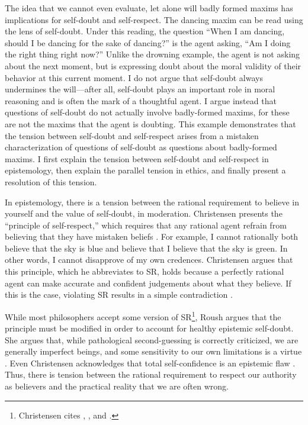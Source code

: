 \begin{isabellebody}
\begin{isamarkuptext}
The idea that we cannot even evaluate, let alone will badly formed maxims has implications for 
self-doubt and self-respect. The dancing maxim can be read using the lens of self-doubt. Under this 
reading, the question ``When I am dancing, should I be dancing for the sake of dancing?'' is the agent asking, 
``Am I doing the right thing right now?'' Unlike the drowning example, the agent is not asking about the 
next moment, but is expressing doubt about the moral validity of their behavior at this current moment. 
I do not argue that self-doubt always undermines the will—after all, self-doubt plays an 
important role in moral reasoning and is often the mark of a thoughtful agent. I argue instead 
that questions of self-doubt do not actually involve badly-formed maxims, for these are not the maxims 
that the agent is doubting. This example demonstrates that the tension between self-doubt and self-respect 
arises from a mistaken characterization of questions of self-doubt as questions about badly-formed maxims.
I first explain the tension between self-doubt and self-respect in epistemology, then 
explain the parallel tension in ethics, and finally present a resolution of this tension.

In epistemology, there is a tension between the rational requirement to believe in yourself and the 
value of self-doubt, in moderation. Christensen presents the ``principle of self-respect,'' which requires 
that any rational agent refrain from believing that they have mistaken beliefs \cite[4]{christensen}. For example, I cannot 
rationally both believe that the sky is blue and believe that I believe that the sky is green. In other words, I cannot 
disapprove of my own credences. Christensen argues that this principle, which he abbreviates to SR, holds because 
a perfectly rational agent can make accurate and confident judgements about what they believe. If this 
is the case, violating SR results in a simple contradiction \cite[8-9]{christensen}. 

While most philosophers accept some version of SR\footnote{Christensen cites \citet{vanfraaseen}, 
\citet{vickers}, and \citet{koons}.}, 
Roush argues that the principle must be modified in order to account for healthy epistemic 
self-doubt. She argues that, while pathological second-guessing is correctly criticized, we are generally 
imperfect beings, and some sensitivity to our own limitations is a virtue \cite[2]{roushselfhelp}. Even Christensen 
acknowledges that total self-confidence is an epistemic flaw \cite[1]{christensen}. Thus, there is tension between the rational
requirement to respect our authority as believers and the practical reality that we are often wrong. 


\end{isamarkuptext}
\end{isabellebody}
